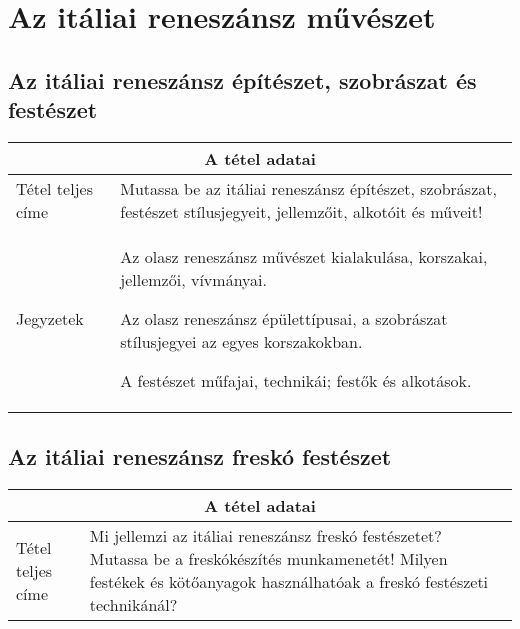 \chapter{Az itáliai reneszánsz művészet} %
\label{ch:8_reneszansz}

\section{Az itáliai reneszánsz építészet, szobrászat és festészet}

\begin{center}
	\begin{longtable}{ | p{} | p{} | }
		
		\hline
		\multicolumn{2}{|c|}{\textbf{A tétel adatai}}
		\\ \hline
		
		\hline
		Tétel teljes címe
		& 
		Mutassa be az itáliai reneszánsz építészet, szobrászat, festészet stílusjegyeit, jellemzőit, alkotóit és műveit!
		\\ \hline
		
		Jegyzetek &
		\begin{compactitem}
			\item Az olasz reneszánsz művészet kialakulása, korszakai, jellemzői, vívmányai.
			\item Az olasz reneszánsz épülettípusai, a szobrászat stílusjegyei az egyes korszakokban.
			\item A festészet műfajai, technikái; festők és alkotások.
		\end{compactitem}
		\\\hline
		
	\end{longtable}
\end{center}

\cleardoublepage


\section{Az itáliai reneszánsz freskó festészet}

\begin{center}
	\begin{longtable}{ | p{} | p{} | }
		
		\hline
		\multicolumn{2}{|c|}{\textbf{A tétel adatai}}
		\\ \hline
		
		\hline
		Tétel teljes címe 
		&
		Mi jellemzi az itáliai reneszánsz freskó festészetet? Mutassa be a freskókészítés munkamenetét! Milyen festékek és kötőanyagok használhatóak a freskó festészeti technikánál?
		\\ \hline
		
	\end{longtable}
\end{center}
